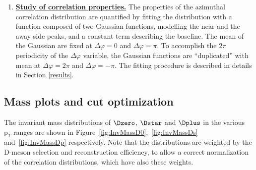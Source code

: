 \begin{enumerate}
\item
\underline{\bf Study of correlation properties.}
The properties of the azimuthal correlation distribution are quantified by fitting the distribution with a function composed of two Gaussian functions, modelling the near and the away side peaks, and a constant term describing the baseline. The mean of the Gaussian are fixed at $\Delta\varphi = 0$ and $\Delta\varphi = \pi$. To accomplish the $2\pi$ periodicity of the $\Delta\varphi$ variable, the Gaussian functions are ``duplicated'' with mean at $\Delta\varphi = 2\pi$ and $\Delta\varphi = -\pi$.
The fitting procedure is described in details in Section \ref{results}.



\end{enumerate}

\subsection{Mass plots and cut optimization}
The invariant mass distributions of $\Dzero$, $\Dstar$ and $\Dplus$ in the various $\text{p}_T$ ranges are shown in Figure~\ref{fig:InvMassD0},~\ref{fig:InvMassDs} and~\ref{fig:InvMassDp} respectively. Note that the distributions are weighted by the D-meson selection and reconstruction efficiency, to allow a correct normalization of the correlation distributions, which have also these weights.

